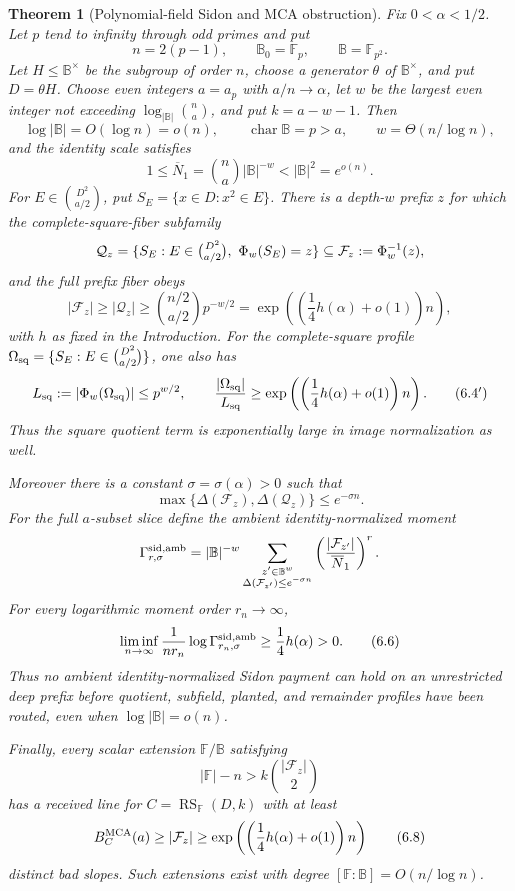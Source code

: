 \documentclass[12pt,a4paper]{amsart}
\numberwithin{equation}{section}
\newtheorem{theorem}{Theorem}[section]
\theoremstyle{remark}
\DeclareMathOperator{\RS}{RS}
\newcommand{\F}{\mathbb F}
\newcommand{\B}{\mathbb B}
\newcommand{\Fcal}{\mathcal F}
\newcommand{\Qcal}{\mathcal Q}
\newcommand{\barN}{\overline N}
\newcommand{\abs}[1]{\lvert #1\rvert}
\begin{document}
\begin{theorem}[Polynomial-field Sidon and MCA obstruction]
\label{thm:smooth-quotient-obstruction}
Fix \(0<\alpha<1/2\).  Let \(p\) tend to infinity through odd primes and
put
\[
 n=2(p-1),\qquad \B_0=\F_p,\qquad \B=\F_{p^2}.
 \tag{6.1}\label{eq:polynomial-field-tower}
\]
Let \(H\le\B^\times\) be the subgroup of order \(n\), choose a generator
\(\theta\) of \(\B^\times\), and put \(D=\theta H\).  Choose even integers
\(a=a_p\) with \(a/n\to\alpha\), let \(w\) be the largest even integer not
exceeding \(\log_{\abs\B}\binom na\), and put \(k=a-w-1\).  Then
\[
 \log\abs\B=O(\log n)=o(n),\qquad
 \operatorname{char}\B=p>a,\qquad
 w=\Theta(n/\log n),
 \tag{6.2}\label{eq:polynomial-field-parameters}
\]
and the identity scale satisfies
\[
 1\le \barN_1=\binom na\abs\B^{-w}<\abs\B^2=e^{o(n)}.
 \tag{6.3}\label{eq:polynomial-identity-scale}
\]
For \(E\in\binom{D^2}{a/2}\), put
\(S_E=\{x\in D:x^2\in E\}\).  There is a depth-\(w\) prefix \(z\) for
which the complete-square-fiber subfamily
\[
 \Qcal_z=\{S_E:E\in\tbinom{D^2}{a/2},\ \Phi_w(S_E)=z\}
 \subseteq \Fcal_z:=\Phi_w^{-1}(z),
\]
and the full prefix fiber obeys
\[
 \abs{\Fcal_z}\ge\abs{\Qcal_z}\ge
 \binom{n/2}{a/2}p^{-w/2}
 =\exp\left(\left(\frac14h(\alpha)+o(1)\right)n\right),
 \tag{6.4}\label{eq:polynomial-large-fiber}
\]
with \(h\) as fixed in the Introduction.
For the complete-square profile
\(\Omega_{\rm sq}=\{S_E:E\in\binom{D^2}{a/2}\}\), one also has
\[
 L_{\rm sq}:=\abs{\Phi_w(\Omega_{\rm sq})}\le p^{w/2},
 \qquad
 \frac{\abs{\Omega_{\rm sq}}}{L_{\rm sq}}
 \ge\exp\left(\left(\frac14h(\alpha)+o(1)\right)n\right).
 \tag{6.4$'$}\label{eq:polynomial-image-profile}
\]
Thus the square quotient term is exponentially large in image
normalization as well.

Moreover there is a constant \(\sigma=\sigma(\alpha)>0\) such that
\[
 \max\{\Delta(\Fcal_z),\Delta(\Qcal_z)\}\le e^{-\sigma n}.
 \tag{6.5}\label{eq:polynomial-sidon-energy}
\]
For the full \(a\)-subset slice define the ambient identity-normalized
moment
\[
 \Gamma^{\rm sid,amb}_{r,\sigma}
 =\abs\B^{-w}
   \sum_{\substack{z'\in\B^w\\
          \Delta(\Fcal_{z'})\le e^{-\sigma n}}}
   \left(\frac{\abs{\Fcal_{z'}}}{\barN_1}\right)^r.
\]
For every logarithmic moment order \(r_n\to\infty\),
\[
 \liminf_{n\to\infty}
 \frac{1}{nr_n}\log\Gamma^{\rm sid,amb}_{r_n,\sigma}
 \ge\frac14h(\alpha)>0.
 \tag{6.6}\label{eq:polynomial-sidon-moment}
\]
Thus no ambient identity-normalized Sidon payment can hold on an unrestricted
deep prefix before quotient, subfield, planted, and remainder profiles
have been routed, even when \(\log\abs\B=o(n)\).

Finally, every scalar extension \(\F/\B\) satisfying
\[
 \abs\F-n>k\binom{\abs{\Fcal_z}}2
 \tag{6.7}\label{eq:polynomial-extension-separation}
\]
has a received line for \(C=\RS_\F(D,k)\) with at least
\[
 B_C^{\rm MCA}(a)\ge\abs{\Fcal_z}
 \ge\exp\left(\left(\frac14h(\alpha)+o(1)\right)n\right)
 \tag{6.8}\label{eq:polynomial-mca-obstruction}
\]
distinct bad slopes.  Such extensions exist with degree
\([\F:\B]=O(n/\log n)\).
\end{theorem}
\end{document}
